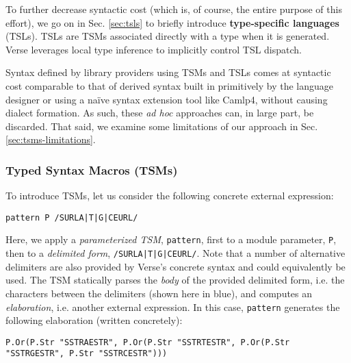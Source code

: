 To further decrease syntactic cost (which is, of course, the entire purpose of this effort), we go on in Sec. \ref{sec:tsls} to briefly introduce \textbf{type-specific languages} (TSLs). TSLs are TSMs associated directly with a type when it is generated. Verse leverages local type inference to implicitly control TSL dispatch.

Syntax defined by library providers using TSMs and TSLs comes at syntactic cost comparable to that of derived syntax built in primitively by the language designer or  using a na\"ive syntax extension tool like Camlp4, without causing dialect formation. As such, these \emph{ad hoc} approaches can, in large part, be discarded. That said, we examine some limitations of our approach in Sec. \ref{sec:tsms-limitations}.

\subsubsection{Typed Syntax Macros (TSMs)}\label{sec:tsms}
To introduce TSMs, let us consider the following concrete external expression:
\begin{lstlisting}[numbers=none]
pattern P /SURLA|T|G|CEURL/
\end{lstlisting}
Here, we apply a \emph{parameterized TSM}, \lstinline{pattern}, first to a module parameter, \lstinline{P}, then to a \emph{delimited form}, \lstinline{/SURLA|T|G|CEURL/}. Note that a number of alternative delimiters are also provided by Verse's concrete syntax and could equivalently be used. The TSM statically parses the \emph{body} of the provided delimited form, i.e. the characters between the delimiters (shown here in blue), and computes an \emph{elaboration}, i.e. another external expression. In this case, \lstinline{pattern} generates the following elaboration (written concretely):

\begin{lstlisting}[numbers=none]
P.Or(P.Str "SSTRAESTR", P.Or(P.Str "SSTRTESTR", P.Or(P.Str "SSTRGESTR", P.Str "SSTRCESTR")))
\end{lstlisting}

